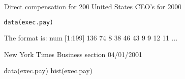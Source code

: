 \begin{Description}\relax
Direct compensation for 200 United States CEO's for 2000
\end{Description}
\begin{Usage}
\begin{verbatim}data(exec.pay)\end{verbatim}
\end{Usage}
\begin{Format}\relax
The format is:
num [1:199] 136 74 8 38 46 43 9 9 12 11 ...
\end{Format}
\begin{Source}\relax
New York Times Business section 04/01/2001
\end{Source}
\begin{Examples}
\begin{ExampleCode}
data(exec.pay)
hist(exec.pay)
\end{ExampleCode}
\end{Examples}

